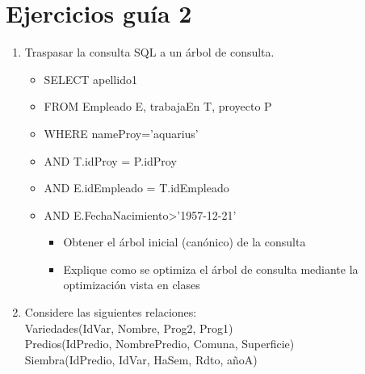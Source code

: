 \documentclass{templateNote}
\begin{document}
\section{Ejercicios guía 2}
\begin{enumerate}
    \item Traspasar la consulta SQL a un árbol de consulta. 
    \begin{itemize}
        \item SELECT apellido1
        \item FROM Empleado E, trabajaEn T, proyecto P
        \item WHERE nameProy=’aquarius’
        \item AND T.idProy = P.idProy
        \item AND E.idEmpleado = T.idEmpleado
        \item AND E.FechaNacimiento>'1957-12-21'
        \begin{itemize}
            \item Obtener el árbol inicial (canónico) de la consulta

            \begin{center}
            \end{center}

            \item Explique como se optimiza el árbol de consulta mediante la optimización vista en clases
        \end{itemize}
    \end{itemize}
    
    \item Considere las siguientes relaciones: \\
    \hspace*{0.25cm} Variedades(IdVar, Nombre, Prog2, Prog1) \\
    \hspace*{0.25cm} Predios(IdPredio, NombrePredio, Comuna, Superficie) \\
    \hspace*{0.25cm} Siembra(IdPredio, IdVar, HaSem, Rdto, añoA) \\
    

\end{enumerate}
\end{document}
